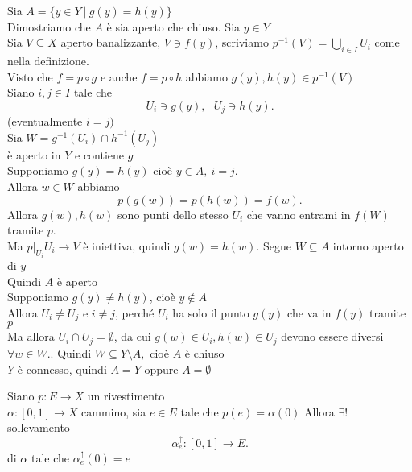 \documentclass[12px]{article}
\begin{document}
\begin{dimo}
	Sia $A = \{y\in Y\ | \ g(y) = h(y)\}$\\
	Dimostriamo che $A$ è sia aperto che chiuso. Sia  $y\in Y$\\
	Sia  $V\subseteq X$ aperto banalizzante, $V\ni f(y)$, scriviamo  $p^{-1}(V) = \bigcup^{}_{i\in I}U_i$ come nella definizione.\\
	Visto che $f = p\circ g$ e anche  $f =p\circ h$ abbiamo $g(y), h(y)\in p^{-1}(V)$\\
	Siano $i,j\in I$ tale che 
	 \[
	U_i\ni g(y), \ \ \  U_j\ni h(y)
	.\] 
	(eventualmente $i=j)$\\
	Sia  $W = g^{-1}(U_i)\cap h^{-1}(U_j)$\\
	è aperto in  $Y$ e contiene $g$\\
	Supponiamo  $g(y) = h(y)$ cioè  $y\in A, \ i=j$.\\
	 Allora  $w\in W$ abbiamo 
	  \[
	 p(g(w)) = p(h(w)) = f(w)
	 .\] 
	 Allora $g(w),h(w)$ sono punti dello stesso  $U_i$ che vanno entrami in $f(W)$ tramite  $p$.\\
	 Ma  $p|_{U_i}U_i \rightarrow V$ è iniettiva, quindi $g(w) = h(w). $ Segue  $W\subseteq A$ intorno aperto di  $y$\\
	 Quindi  $A$ è aperto\\
	 Supponiamo $g(y)\neq h(y)$, cioè  $y\not\in A$\\
	 Allora  $U_i\neq U_j$ e  $i\neq j$, perché  $U_i$ ha solo il punto  $g(y)$ che va in $f(y)$ tramite  $p$\\
	 Ma allora  $U_i\cap U_j = \emptyset$, da cui  $g(w)\in U_i, h(w)\in U_j$ devono essere diversi $\forall w\in W. $. Quindi $W\subseteq Y\setminus A,$ cioè  $A$ è chiuso\\
	  $Y$ è connesso, quindi $A = Y$ oppure  $A = \emptyset$
\end{dimo}
\begin{teo}
	Siano $p:E \rightarrow X$ un rivestimento\\
	$\alpha:[0,1] \rightarrow X$ cammino, sia $e\in E$ tale che  $p(e) = \alpha(0)$ Allora  $\exists !$ sollevamento
	 \[
		 \alpha^\uparrow_e:[0,1] \rightarrow E
	.\] 
	di $\alpha$ tale che $\alpha^\uparrow_e(0) = e$
\end{teo}
\end{document}
